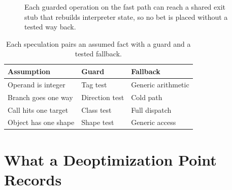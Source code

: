 \begin{figure}[htbp]
\centering
{}
\caption{Each guarded operation on the fast path can reach a shared exit stub that rebuilds interpreter state, so no bet is placed without a tested way back.}
\label{fig:ch35-guard-point}
\end{figure}

\begin{table}[htbp]
\centering
\caption{Each speculation pairs an assumed fact with a guard and a tested fallback.}
\label{tab:ch35-speculations}
\begin{tabular}{lll}
\toprule
Assumption & Guard & Fallback \\
\midrule
Operand is integer & Tag test & Generic arithmetic \\
Branch goes one way & Direction test & Cold path \\
Call hits one target & Class test & Full dispatch \\
Object has one shape & Shape test & Generic access \\
\bottomrule
\end{tabular}
\end{table}

\section{What a Deoptimization Point Records}\label{sec:ch35-points}

